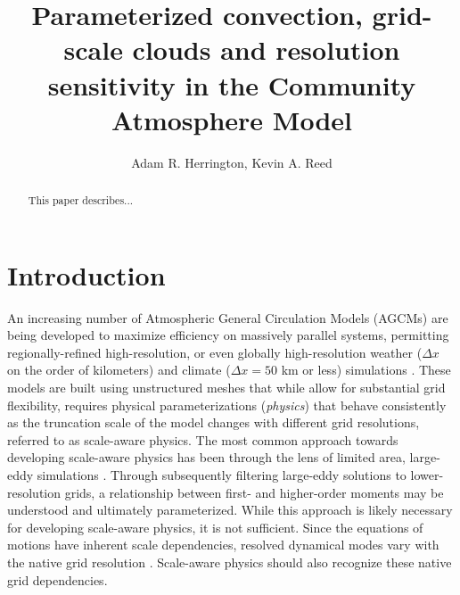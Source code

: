 \documentclass[times]{qjrms4}
\begin{document}

\title{Parameterized convection, grid-scale clouds and resolution sensitivity in the Community Atmosphere Model}

\author{Adam R. Herrington\corrauth, Kevin A. Reed}
\address{School of Marine and Atmospheric Sciences, Stony Brook University, Stony Brook, NY 11794}


\begin{abstract}
This paper describes...
\end{abstract}


\maketitle

\section{Introduction}

An increasing number of Atmospheric General Circulation Models (AGCMs) are being developed to maximize efficiency on massively parallel systems, permitting regionally-refined high-resolution, or even globally high-resolution weather ($\Delta x$ on the order of kilometers) and climate ($\Delta x = 50$ km or less) simulations \citep{MPASatm,Z2014QJRMS,HETAL2016JCLIM,DCMIP16,LetAl2018JAMES}. These models are built using unstructured meshes that while allow for substantial grid flexibility, requires physical parameterizations ({\em{physics}}) that behave consistently as the truncation scale of the model changes with different grid resolutions, referred to as scale-aware physics. The most common approach towards developing scale-aware physics has been through the lens of limited area, large-eddy simulations \citep[e.g.,][]{PC2008JAS,AW2013JAS,SZ2018JCLIM}. Through subsequently filtering large-eddy solutions to lower-resolution grids, a relationship between first- and higher-order moments \citep{G1992JFM} may be understood and ultimately parameterized. While this approach is likely necessary for developing scale-aware physics, it is not sufficient. Since the equations of motions have inherent scale dependencies, resolved dynamical modes vary with the native grid resolution \citep{O1981JAS,WETAL1997MWR,PG2006JAS,JR2016QJRMS,J2017JAMES}. Scale-aware physics should also recognize these native grid dependencies.
\end{document}
